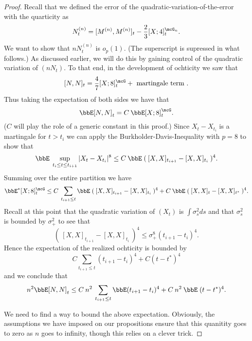 \documentclass{report}
\begin{document}
\begin{proof}
Recall that we defined the error of the
quadratic-variation-of-the-error with the quarticity as
\[
N^{(n)}_t =  [M^{(n)},M^{(n)}]_t - \frac{2}{3} [X;4]^{\mcG_n}_t .
\]
We want to show that $n N^{(n)}_t$ is $o_p(1)$.  (The superscript is
supressed in what follows.)  As discussed earlier, we will do this by
gaining control of the quadratic variation of $(n N_t)$.  To that end,
in the development of ochticity we saw that
\[
[N,N]_t = \frac{4}{7}[X;8]^{\mcG}_t + \textmd{ martingale term }.
\]
Thus taking the expectation of both sides we have that
\[
\bbE [N,N]_t = C \: \bbE [X;8]^\mcG_t.
\]
($C$ will play the role of a generic constant in this proof.)  
Since $X_t - X_{t_i}$ is a martingale for $t > t_i$ we can apply the
Burkholder-Davis-Inequality with $p=8$ to show that
\[
\bbE \; \sup_{t_i \leq t \leq t_{i+1}} |X_t - X_{t_i}|^8  \leq C \:
\bbE \; ( \:[X,X]_{t_{i+1}} - [X,X]_{t_i} \: )^4.
\]
Summing over the entire partition we have
\[
\bbE^* [X;8]^\mcG_t \leq C \: \sum_{t_{i+1} \leq t} \bbE \; (
\:[X,X]_{t_{i+1}} - [X,X]_{t_i} \: )^4 + C \: \bbE \; ( \:[X,X]_{t} -  
[X,X]_{t^*} \: )^4 .
\]
Recall at this point that the quadratic variation of $(X_t)$ is $\int
\sigma^2_s ds$ and that $\sigma_s^2$ is bounded by $\sigma_+^2$ to see
that
\[
( \:[X,X]_{t_{i+1}} - [X,X]_{t_i} \: )^4 \leq \sigma_+^8 ( t_{i+1} -
t_i)^4.
\]
Hence the expectation of the realized ochticity is bounded by
\[
C \sum_{t_{i+1} \leq t} ( t_{i+1} - t_i)^4 + C ( t - t^*)^4
\]
and we conclude that
\[
n^2 \bbE [N,N]_t \leq C \: n^2 \: \sum_{t_{i+1} \leq t} \bbE (  
t_{i+1} - t_i)^4 + C \: n^2 \: \bbE \; ( t - t^*)^4 .
\]

We need to find a way to bound the above expectation.  Obviously, the
assumptions we have imposed on our propositions ensure that this
quanitity goes to zero as $n$ goes to infinity, though this relies on 
a clever trick.  


\end{proof}
\end{document}
